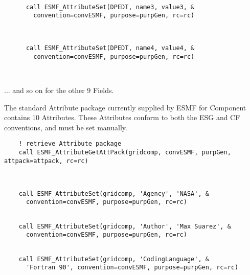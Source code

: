  \begin{verbatim}

      call ESMF_AttributeSet(DPEDT, name3, value3, &
        convention=convESMF, purpose=purpGen, rc=rc)
 
\end{verbatim}
 

 \begin{verbatim}

      call ESMF_AttributeSet(DPEDT, name4, value4, &
        convention=convESMF, purpose=purpGen, rc=rc)

 
\end{verbatim}
 

       ... and so on for the other 9 Fields.
  
       The standard Attribute package currently supplied by ESMF for
       Component contains 10 Attributes.  These Attributes conform to both
       the ESG and CF conventions, and must be set manually. 

 \begin{verbatim}
    ! retrieve Attribute package
    call ESMF_AttributeGetAttPack(gridcomp, convESMF, purpGen, attpack=attpack, rc=rc)
 
\end{verbatim}
 

 \begin{verbatim}

    call ESMF_AttributeSet(gridcomp, 'Agency', 'NASA', &
      convention=convESMF, purpose=purpGen, rc=rc)
 
\end{verbatim}
 

 \begin{verbatim}
    call ESMF_AttributeSet(gridcomp, 'Author', 'Max Suarez', &
      convention=convESMF, purpose=purpGen, rc=rc)
 
\end{verbatim}
 

 \begin{verbatim}
    call ESMF_AttributeSet(gridcomp, 'CodingLanguage', &
      'Fortran 90', convention=convESMF, purpose=purpGen, rc=rc)
 
\end{verbatim}
 
